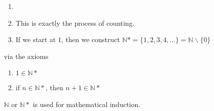 \documentclass[10pt]{article}
\begin{document}
	\begin{description}
		\item[Remarks:]
		\begin{enumerate}
			\item[]
			\item This is exactly the process of counting.
			\item If we start at $1$, then we construct $\mathbb{N}* = \{1, 2, 3, 4, ...\} = \mathbb{N} \backslash \{0\}$
		\end{enumerate}
		\item via the axioms
		\begin{enumerate}
			\item $1 \in \mathbb{N}*$
			\item if $n \in \mathbb{N}*$, then $n+1 \in \mathbb{N}*$
		\end{enumerate}
		\item $\mathbb{N}$ or $\mathbb{N}*$ is used for mathematical induction.
	\end{description}
	
\end{document}

